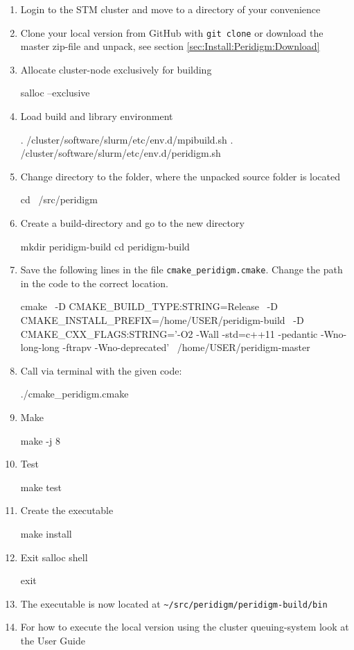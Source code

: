 \begin{enumerate}[noitemsep]
  \item Login to the STM cluster and move to a directory of your convenience
  \item Clone your local \toolname{} version from GitHub with \verb+git clone+ or download the master zip-file and unpack, see section \ref{sec:Install:Peridigm:Download}
  \item Allocate cluster-node exclusively for building
\begin{code}
salloc --exclusive
\end{code}
  \item Load build and library environment
\begin{code}
. /cluster/software/slurm/etc/env.d/mpibuild.sh 
. /cluster/software/slurm/etc/env.d/peridigm.sh
\end{code}
\item Change directory to the folder, where the unpacked \toolname{} source folder is located
\begin{code}
cd ~/src/peridigm
\end{code}
  \item Create a build-directory and go to the new directory
\begin{code}
mkdir peridigm-build
cd peridigm-build
\end{code}
  \item Save the following lines in the file \texttt{cmake\_peridigm.cmake}. Change the path in the code to the correct location.
\begingroup
\lstset{breaklines=true}
\begin{code}
cmake \
-D CMAKE_BUILD_TYPE:STRING=Release \
-D CMAKE_INSTALL_PREFIX=/home/USER/peridigm-build \
-D CMAKE_CXX_FLAGS:STRING='-O2 -Wall -std=c++11 -pedantic -Wno-long-long -ftrapv -Wno-deprecated' \
/home/USER/peridigm-master
\end{code}
\endgroup
  \item Call \cmakename{} via terminal with the given code:
\begingroup
\lstset{breaklines=true}
\begin{code}
./cmake_peridigm.cmake
\end{code}
\endgroup
  \item Make
\begin{code}
make -j 8
\end{code}
  \item Test
\begin{code}
make test
\end{code}
  \item Create the executable 
\begin{code}
make install
\end{code}
  \item Exit salloc shell
\begin{code}
exit
\end{code}
  \item The executable is now located at \verb+~/src/peridigm/peridigm-build/bin+
  \item For how to execute the local version using the cluster queuing-system look at the \toolname{} User Guide
\end{enumerate}

